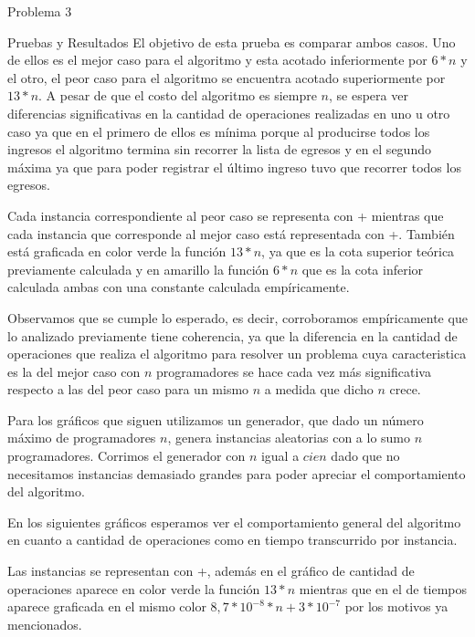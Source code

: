 \begin{section}{Problema 3}
\begin{subsection}{Pruebas y Resultados}
	El objetivo de esta prueba es comparar ambos casos. Uno de ellos es el mejor caso para el algoritmo y esta acotado inferiormente por $6*n$ y el otro, el peor caso para el algoritmo se encuentra acotado superiormente por $13*n$. A pesar de que el costo del algoritmo es siempre $n$, se espera ver diferencias significativas en la cantidad de operaciones realizadas en uno u otro caso ya que en el primero de ellos es mínima porque al producirse todos los ingresos el algoritmo termina sin recorrer la lista de egresos y en el segundo máxima ya que para poder registrar el último ingreso tuvo que recorrer todos los egresos.
	
	Cada instancia correspondiente al peor caso se representa con {\color{red}+} mientras que cada instancia que corresponde al mejor caso está representada con {\color{blue}+}. También está graficada en color verde la función $13*n$, ya que es la cota superior teórica previamente calculada y en amarillo la función $6*n$ que es la cota inferior calculada ambas con una constante calculada empíricamente.\VSP
	
	\VSP

	Observamos que se cumple lo esperado, es decir, corroboramos empíricamente que lo analizado previamente tiene coherencia, ya que la diferencia en la cantidad de operaciones que realiza el algoritmo para resolver un problema cuya caracteristica es la del mejor caso con $n$ programadores se hace cada vez más significativa respecto a las del peor caso para un mismo $n$ a medida que dicho $n$ crece.
	
	Para los gráficos que siguen utilizamos un generador, que dado un número máximo de programadores $n$, genera instancias aleatorias con a lo sumo $n$ programadores. Corrimos el generador con $n$ igual a $cien$ dado que no necesitamos instancias demasiado grandes para poder apreciar el comportamiento del algoritmo.

	En los siguientes gráficos esperamos ver el comportamiento general del algoritmo en cuanto a cantidad de operaciones como en tiempo transcurrido por instancia.
	
	Las instancias se representan con {\color{red}+}, además en el gráfico de cantidad de operaciones aparece en color verde la función $13*n$ mientras que en el de tiempos aparece graficada en el mismo color $8,7*10^{-8}*n+3*10^{-7}$ por los motivos ya mencionados.\VSP

	\VSP
	


\end{subsection}
\end{section}
